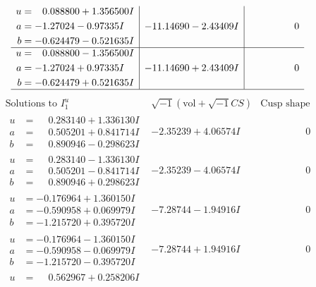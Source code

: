 \documentclass[1p]{elsarticle_modified}
\theoremstyle{definition}
\newcommand{\I}{\sqrt{-1}}
\begin{document}
$$\begin{array}{c|c|c}
\begin{aligned}
u &= \phantom{-}0.088800 + 1.356500 I \\
a &= -1.27024 - 0.97335 I \\
b &= -0.624479 - 0.521635 I\end{aligned}
 & -11.14690 - 2.43409 I & \phantom{-0.000000 } 0 \\ \hline\begin{aligned}
u &= \phantom{-}0.088800 - 1.356500 I \\
a &= -1.27024 + 0.97335 I \\
b &= -0.624479 + 0.521635 I\end{aligned}
 & -11.14690 + 2.43409 I & \phantom{-0.000000 } 0\\
 \hline 
 \end{array}$$\newpage$$\begin{array}{c|c|c}  
\text{Solutions to }I^u_{1}& \I (\text{vol} + \sqrt{-1}CS) & \text{Cusp shape}\\
 \hline 
\begin{aligned}
u &= \phantom{-}0.283140 + 1.336130 I \\
a &= \phantom{-}0.505201 + 0.841714 I \\
b &= \phantom{-}0.890946 - 0.298623 I\end{aligned}
 & -2.35239 + 4.06574 I & \phantom{-0.000000 } 0 \\ \hline\begin{aligned}
u &= \phantom{-}0.283140 - 1.336130 I \\
a &= \phantom{-}0.505201 - 0.841714 I \\
b &= \phantom{-}0.890946 + 0.298623 I\end{aligned}
 & -2.35239 - 4.06574 I & \phantom{-0.000000 } 0 \\ \hline\begin{aligned}
u &= -0.176964 + 1.360150 I \\
a &= -0.590958 + 0.069979 I \\
b &= -1.215720 + 0.395720 I\end{aligned}
 & -7.28744 - 1.94916 I & \phantom{-0.000000 } 0 \\ \hline\begin{aligned}
u &= -0.176964 - 1.360150 I \\
a &= -0.590958 - 0.069979 I \\
b &= -1.215720 - 0.395720 I\end{aligned}
 & -7.28744 + 1.94916 I & \phantom{-0.000000 } 0 \\ \hline\begin{aligned}
u &= \phantom{-}0.562967 + 0.258206 I \\

\end{aligned}
\end{array}$$
\end{document}
